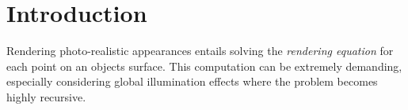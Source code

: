 \section{Introduction}
Rendering photo-realistic appearances entails solving the \textit{rendering equation} for each point on an objects surface. This computation can be extremely demanding, especially considering global illumination effects where the problem becomes highly recursive.
